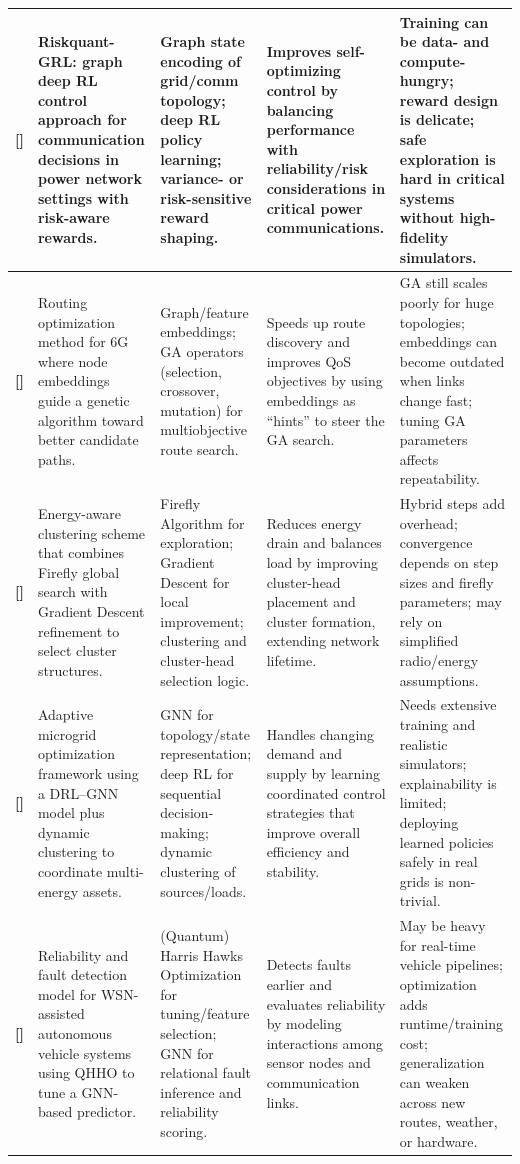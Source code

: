 \documentclass[a4paper,fleqn]{cas-dc}
\numberwithin{equation}{section}
\begin{document}
\begin{table}[t]
\begin{tabular}{|p{}|p{}|p{}|p{}|p{}|}
\textbf{[\cite{Jiang2025}]} &
Riskquant-GRL: graph deep RL control approach for communication decisions in power network settings with risk-aware rewards. &
Graph state encoding of grid/comm topology; deep RL policy learning; variance- or risk-sensitive reward shaping. &
Improves self-optimizing control by balancing performance with reliability/risk considerations in critical power communications. &
Training can be data- and compute-hungry; reward design is delicate; safe exploration is hard in critical systems without high-fidelity simulators. \\
\hline

\textbf{[\cite{Lee2025}]} &
Routing optimization method for 6G where node embeddings guide a genetic algorithm toward better candidate paths. &
Graph/feature embeddings; GA operators (selection, crossover, mutation) for multiobjective route search. &
Speeds up route discovery and improves QoS objectives by using embeddings as “hints” to steer the GA search. &
GA still scales poorly for huge topologies; embeddings can become outdated when links change fast; tuning GA parameters affects repeatability. \\
\hline

\textbf{[\cite{Kavitha20251463}]} &
Energy-aware clustering scheme that combines Firefly global search with Gradient Descent refinement to select cluster structures. &
Firefly Algorithm for exploration; Gradient Descent for local improvement; clustering and cluster-head selection logic. &
Reduces energy drain and balances load by improving cluster-head placement and cluster formation, extending network lifetime. &
Hybrid steps add overhead; convergence depends on step sizes and firefly parameters; may rely on simplified radio/energy assumptions. \\
\hline

\textbf{[\cite{Kaal2025427}]} &
Adaptive microgrid optimization framework using a DRL--GNN model plus dynamic clustering to coordinate multi-energy assets. &
GNN for topology/state representation; deep RL for sequential decision-making; dynamic clustering of sources/loads. &
Handles changing demand and supply by learning coordinated control strategies that improve overall efficiency and stability. &
Needs extensive training and realistic simulators; explainability is limited; deploying learned policies safely in real grids is non-trivial. \\
\hline

\textbf{[\cite{Eldho2025614}]} &
Reliability and fault detection model for WSN-assisted autonomous vehicle systems using QHHO to tune a GNN-based predictor. &
(Quantum) Harris Hawks Optimization for tuning/feature selection; GNN for relational fault inference and reliability scoring. &
Detects faults earlier and evaluates reliability by modeling interactions among sensor nodes and communication links. &
May be heavy for real-time vehicle pipelines; optimization adds runtime/training cost; generalization can weaken across new routes, weather, or hardware. \\
\hline


\end{tabular}
\end{table}
\end{document}
